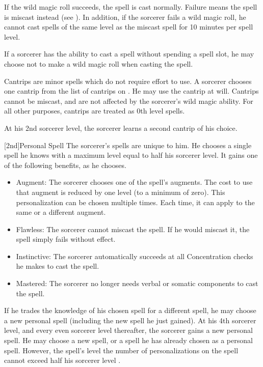 If the wild magic roll succeeds, the spell is cast normally.
Failure means the spell is miscast instead (see ).
In addition, if the sorcerer fails a wild magic roll, he cannot cast spells of the same level as the miscast spell for 10 minutes per spell level.

If a sorcerer has the ability to cast a spell without spending a spell slot, he may choose not to make a wild magic roll when casting the spell.

Cantrips are minor spells which do not require effort to use.
A sorcerer chooses one cantrip from the list of cantrips on .
He may use the cantrip at will.
Cantrips cannot be miscast, and are not affected by the sorcerer's wild magic ability.
For all other purposes, cantrips are treated as 0th level spells.

At his 2nd sorcerer level, the sorcerer learns a second cantrip of his choice.

[2nd]{Personal Spell}
The sorcerer's spells are unique to him.
He chooses a single spell he knows with a maximum level equal to half his sorcerer level.
It gains one of the following benefits, as he chooses.
\begin{itemize}
    \item Augment: The sorcerer chooses one of the spell's augments.
        The cost to use that augment is reduced by one level (to a minimum of zero).
        This personalization can be chosen multiple times.
        Each time, it can apply to the same or a different augment.
    \item Flawless: The sorcerer cannot miscast the spell.
        If he would miscast it, the spell simply fails without effect.
    \item Instinctive: The sorcerer automatically succeeds at all Concentration checks he makes to cast the spell.
    \item Mastered: The sorcerer no longer needs verbal or somatic components to cast the spell.
\end{itemize}

If he trades the knowledge of his chosen spell for a different spell, he may choose a new personal spell (including the new spell he just gained).
At his 4th sorcerer level, and every even sorcerer level thereafter, the sorcerer gains a new personal spell.
He may choose a new spell, or a spell he has already chosen as a personal spell.
However, the spell's level \add the number of personalizations on the spell cannot exceed half his sorcerer level .

